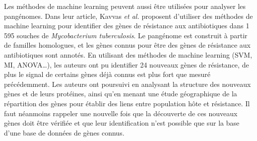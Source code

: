 Les méthodes de machine learning peuvent aussi être utilisées pour analyser les pangénomes. Dans leur article, Kavvas \textit{et al.} \cite{kavvas_machine_2018} proposent d'utiliser des méthodes de machine learning pour identifier des gènes de résistance aux antibiotiques dans 1 595 souches de \textit{Mycobacterium tuberculosis}. Le pangénome est construit à partir de familles homologues, et les gènes connus pour être des gènes de résistance aux antibiotiques sont annotés. En utilisant des méthodes de machine learning (SVM, MI, ANOVA\dots), les auteurs ont pu identifier 24 nouveaux gènes de résistance, de plus le signal de certains gènes déjà connus est plus fort que mesuré précédemment. Les auteurs ont poursuivi en analysant la structure des nouveaux gènes et de leurs protéines, ainsi qu'en menant une étude géographique de la répartition des gènes pour établir des liens entre population hôte et résistance. Il faut néanmoins rappeler une nouvelle fois que la découverte de ces nouveaux gènes doit être vérifiée et que leur identification n'est possible que sur la base d'une base de données de gènes connus.

